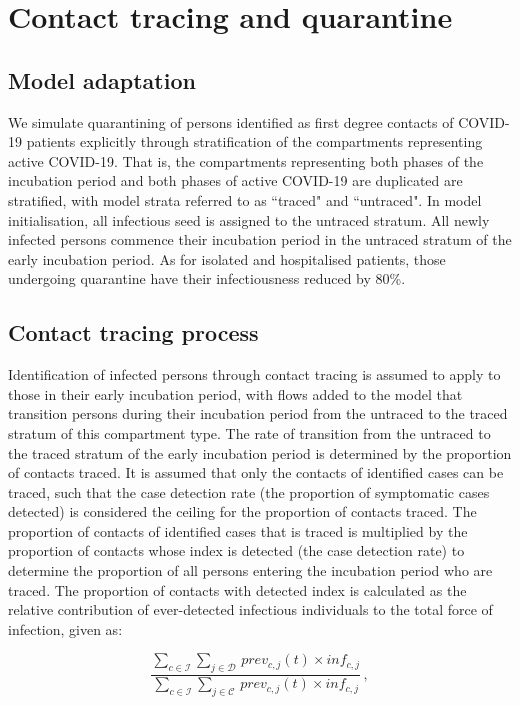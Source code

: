 \section{Contact tracing and quarantine}

\subsection{Model adaptation}
We simulate quarantining of persons identified as first degree contacts of COVID-19 patients explicitly through stratification of the compartments representing active COVID-19.
That is, the compartments representing both phases of the incubation period and both phases of active COVID-19 are duplicated are stratified, with model strata referred to as ``traced" and ``untraced".
In model initialisation, all infectious seed is assigned to the untraced stratum.
All newly infected persons commence their incubation period in the untraced stratum of the early incubation period.
As for isolated and hospitalised patients, those undergoing quarantine have their infectiousness reduced by 80\%.

\subsection{Contact tracing process}
Identification of infected persons through contact tracing is assumed to apply to those in their early incubation period, with flows added to the model that transition persons during their incubation period from the untraced to the traced stratum of this compartment type.
The rate of transition from the untraced to the traced stratum of the early incubation period is determined by the proportion of contacts traced.
It is assumed that only the contacts of identified cases can be traced, such that the case detection rate (the proportion of symptomatic cases detected) is considered the ceiling for the proportion of contacts traced.
The proportion of contacts of identified cases that is traced is multiplied by the proportion of contacts whose index is detected (the case detection rate) to determine the proportion of all persons entering the incubation period who are traced.
The proportion of contacts with detected index is calculated as the relative contribution of ever-detected infectious individuals to the total force of infection, given as:

\[ \frac
{\sum_{c \in \mathcal{I}} \sum_{j \in \mathcal{D}} \, prev_{c, j}(t) \times inf_{c, j}}
{\sum_{c \in \mathcal{I}} \sum_{j \in \mathcal{C}} \, prev_{c, j}(t) \times inf_{c, j}} \, ,
\]

